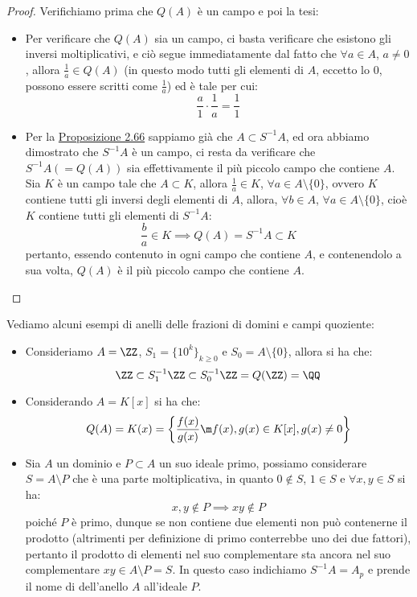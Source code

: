 \documentclass[11pt]{scrartcl}
\begin{document}
\begin{proof}
    Verifichiamo prima che $Q(A)$ è un campo e poi la tesi:
    \begin{itemize}
        \item Per verificare che $Q(A)$ sia un campo, ci basta verificare che esistono gli inversi moltiplicativi, e ciò segue immediatamente
         dal fatto che $\forall a \in A$, $a \ne 0$, allora $\displaystyle\frac{1}{a} \in Q(A)$ (in questo modo tutti gli elementi di $A$, eccetto lo 0,
         possono essere scritti come $\displaystyle\frac{1}{a}$) ed è tale per cui:
            \[ \frac{a}{1} \cdot \frac{1}{a} = \frac{1}{1}
                \]
        \item Per la \hyperref[2.66]{Proposizione 2.66} sappiamo già che $A \subset S^{-1}A$, ed ora abbiamo dimostrato che $S^{-1}A$ è un campo, ci resta da verificare 
        che $S^{-1}A (= Q(A))$ sia effettivamente il più piccolo campo che contiene $A$. Sia $K$ è un campo tale che $A \subset K$, allora $\displaystyle \frac{1}{a} \in K$, $\forall a \in A \setminus\{0\}$, ovvero $K$ 
        contiene tutti gli inversi degli elementi di $A$, allora, $\forall b \in A$, $\forall a \in A \setminus \{0\}$, cioè $K$ contiene tutti gli elementi di $S^{-1}A$:
            \[ \frac{b}{a} \in K \implies Q(A) = S^{-1}A \subset K
                \]
        pertanto, essendo contenuto in ogni campo che contiene $A$, e contenendolo a sua volta, $Q(A)$ è il più piccolo campo che contiene $A$.
    \end{itemize}
\end{proof}

\begin{example}
    Vediamo alcuni esempi di anelli delle frazioni di domini e campi quoziente:
    \begin{itemize}
        \item Consideriamo $A = \ZZ$, $S_1 = \{10^k\}_{k\geq 0}$ e $S_0 = A \setminus\{0\}$, allora si ha che:
            \[ \ZZ \subset S_1^{-1}\ZZ \subset S_0^{-1}\ZZ = Q(\ZZ) = \QQ
                \]
        \item Considerando $A = K[x]$ si ha che:
            \[ Q(A) = K(x) = \left\{\frac{f(x)}{g(x)} \m f(x),g(x) \in K[x], g(x) \ne 0\right\}
                \]
        \item Sia $A$ un dominio e $P \subset A$ un suo ideale primo, possiamo considerare $S = A \setminus P$ che è una parte moltiplicativa, in quanto 
            $0 \not\in S$, $1 \in S$ e $\forall x,y \in S$ si ha:
            \[ x,y \not\in P \implies xy \not\in P
                \]
            poiché $P$ è primo, dunque se non contiene due elementi non può contenerne il prodotto (altrimenti per definizione di primo conterrebbe uno dei due fattori), pertanto il prodotto di elementi nel suo complementare
            sta ancora nel suo complementare $xy \in A \setminus P = S$. In questo caso indichiamo $S^{-1}A = A_p$ e prende il nome di  dell'anello $A$ all'ideale $P$.
    \end{itemize}
\end{example}
\end{document}
